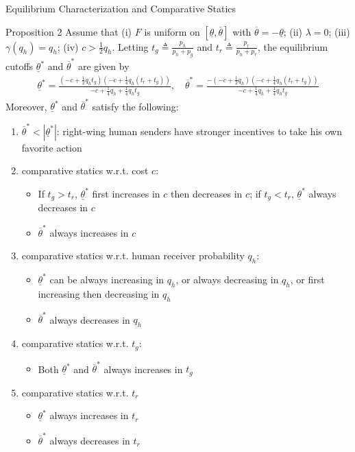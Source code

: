 \documentclass[9pt,aspectratio=1610]{beamer}
\begin{document}
\begin{frame}{Equilibrium Characterization and Comparative Statics}
\vspace{-1em}
\begin{exampleblock}{Proposition 2}
    Assume that (i) $F$ is uniform on $[\underline{\theta},\overline{\theta}]$ with $\overline{{\theta}}=-\underline{\theta}$; (ii) $\lambda=0$; (iii) $\gamma(q_h) = q_h$; (iv) $c>\frac{1}{2}q_h$. Letting $t_g\triangleq \frac{p_h}{p_h+p_g}$ and $t_r\triangleq\frac{p_r}{p_h+p_r}$, the equilibrium cutoffs $\underline{\theta}^*$ and $\overline{\theta}^*$ are given by
    \begin{align*}
        \underline{\theta}^* = \frac{(-c+\frac{1}{2}q_ht_g)(-c+\frac{1}{4}q_h(t_r + t_g))}{-c+\frac{1}{4}q_h+\frac{1}{4}q_ht_g},\quad \overline{\theta}^* = \frac{-(-c+\frac{1}{2}q_h)(-c+\frac{1}{4}q_h(t_r + t_g))}{-c+\frac{1}{4}q_h+\frac{1}{4}q_ht_g}
    \end{align*}
    Moreover, $\underline{\theta}^*$ and $\overline{\theta}^*$ satisfy the following:
    \begin{enumerate}
        \item $\overline{\theta}^*<|\underline{\theta}^*|$: right-wing human senders have stronger incentives to take his own favorite action
        \item comparative statics w.r.t. cost $c$: 
        \begin{itemize}
            \item If $t_g>t_r$, $\underline{\theta}^*$ first increases in $c$ then decreases in $c$; if $t_g<t_r$, $\underline{\theta}^*$ always decreases in $c$
            \item $\overline{\theta}^*$ always increases in $c$
        \end{itemize}
        \item comparative statics w.r.t. human receiver probability $q_h$:
        \begin{itemize}
            \item $\underline{\theta}^*$ can be always increasing in $q_h$, or always decreasing in $q_h$, or first increasing then decreasing in $q_h$
            \item $\overline{\theta}^*$ always decreases in $q_h$
        \end{itemize}
        \item comparative statics w.r.t. $t_g$:
        \begin{itemize}
            \item Both $\underline{\theta}^*$ and $\overline{\theta}^*$ always increases in $t_g$
        \end{itemize}
        \item comparative statics w.r.t. $t_r$
        \begin{itemize}
            \item $\underline{\theta}^*$ always increases in $t_r$
            \item $\overline{\theta}^*$ always decreases in $t_r$
        \end{itemize}
    \end{enumerate}
\end{exampleblock}
\end{frame}
\end{document}
